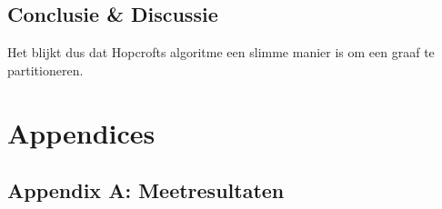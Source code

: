 \documentclass[twoside]{article}
\begin{document}
\begin{multicols}{2}
\section{Conclusie \& Discussie}
Het blijkt dus dat Hopcrofts algoritme een slimme manier is om een graaf te partitioneren. 

\lipsum[8] %


 


\end{multicols}


\newpage
\section{Appendices}
\subsection{Appendix A: Meetresultaten} \label{AppendixA}
\end{document}
